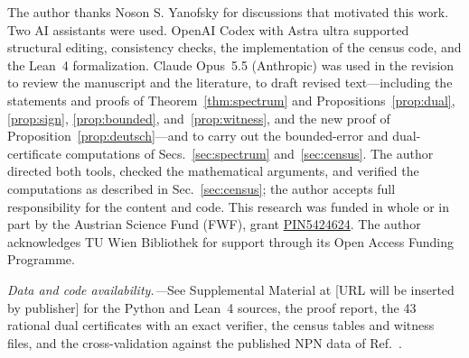 \documentclass[
  aps,
  pra,
  reprint,
  nofootinbib
]{revtex4-2}
\begin{document}
\begin{acknowledgments}
The author thanks Noson S. Yanofsky for discussions that motivated this
work. Two AI assistants were used. OpenAI Codex with Astra ultra
supported structural editing, consistency checks, the implementation of the
census code, and the Lean~4 formalization. Claude Opus~5.5 (Anthropic) was
used in the revision to review the manuscript and the literature, to draft
revised text---including the statements and proofs of
Theorem~\ref{thm:spectrum} and Propositions~\ref{prop:dual},
\ref{prop:sign}, \ref{prop:bounded}, and~\ref{prop:witness}, and the new
proof of Proposition~\ref{prop:deutsch}---and to carry out the bounded-error and
dual-certificate computations of Secs.~\ref{sec:spectrum} and~\ref{sec:census}.
The author directed both tools, checked the mathematical arguments, and
verified the computations as described in Sec.~\ref{sec:census}; the author
accepts full responsibility for the content and code. This research
was funded in whole or in part by the Austrian Science Fund (FWF), grant
\href{https://doi.org/10.55776/PIN5424624}{PIN5424624}. The author
acknowledges TU Wien Bibliothek for support through its Open Access Funding
Programme.
\end{acknowledgments}

\noindent\textit{Data and code availability.---}See Supplemental Material at
[URL will be inserted by publisher] for the Python and Lean~4 sources, the
proof report, the 43 rational dual certificates with an exact verifier, the
census tables and witness files, and the cross-validation against the
published NPN data of Ref.~\cite{MontanaroJozsaMitchison2015}.


\end{document}
